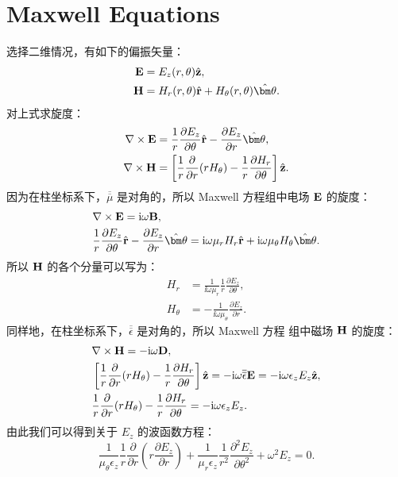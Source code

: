 \chapter{Maxwell Equations}

选择二维情况，有如下的偏振矢量：
\begin{subequations}
  \begin{align}
    {\bf E} &= E_z(r, \theta) \hat{\bf z}, \\
    {\bf H} &= H_r(r, \theta) \hat{\bf r} + H_\theta(r, \theta) \hat{\bm\theta}.
  \end{align}
\end{subequations}
对上式求旋度：
\begin{subequations}
  \begin{align}
    \nabla \times {\bf E} &= \frac{1}{r} \frac{\partial E_z}{\partial\theta}
      \hat{\bf r} - \frac{\partial E_z}{\partial r} \hat{\bm\theta}, \\
    \nabla \times {\bf H} &= \left[\frac{1}{r} \frac{\partial}{\partial r}
      (r H_\theta) - \frac{1}{r} \frac{\partial H_r}{\partial\theta} \right]
      \hat{\bf z}.
  \end{align}
\end{subequations}
因为在柱坐标系下，$\overline{\overline\mu}$ 是对角的，所以 Maxwell 方程组中电场
$\bf E$ 的旋度：
\begin{subequations}
  \begin{align}
    & \nabla \times {\bf E} = \ii \omega {\bf B}, \\
    & \frac{1}{r} \frac{\partial E_z}{\partial\theta} \hat{\bf r} -
      \frac{\partial E_z}{\partial r}\hat{\bm\theta} = \ii \omega \mu_r H_r
      \hat{\bf r} + \ii \omega \mu_\theta H_\theta \hat{\bm\theta}.
  \end{align}
\end{subequations}
所以 $\bf H$ 的各个分量可以写为：
\begin{subequations}
  \begin{align}
    H_r &= \frac{1}{\ii \omega \mu_r} \frac{1}{r}
      \frac{\partial E_z}{\partial\theta}, \\
    H_\theta &= -\frac{1}{\ii \omega \mu_\theta}
      \frac{\partial E_z}{\partial r}.
  \end{align}
\end{subequations}
同样地，在柱坐标系下，$\overline{\overline\epsilon}$ 是对角的，所以 Maxwell 方程
组中磁场 $\bf H$ 的旋度：
\begin{subequations}
  \begin{align}
    & \nabla \times {\bf H} = -\mathrm{i} \omega {\bf D}, \\
    & \left[\frac{1}{r} \frac{\partial}{\partial r}(r H_\theta) - \frac{1}{r}
      \frac{\partial H_r}{\partial\theta} \right] \hat{\bf z} = -\mathrm{i} \omega
      {\overline{\overline\epsilon}} {\bf E} = -\mathrm{i} \omega \epsilon_z E_z
      \hat{\bf z}, \\
    & \frac{1}{r} \frac{\partial}{\partial r}(r H_\theta) - \frac{1}{r}
      \frac{\partial H_r}{\partial\theta} = -\mathrm{i} \omega \epsilon_z E_z.
  \end{align}
\end{subequations}
由此我们可以得到关于 $E_z$ 的波函数方程：
\begin{equation}
  \frac{1}{\mu_\theta \epsilon_z} \frac{1}{r} \frac{\partial}{\partial r}
  \left(r \frac{\partial E_z}{\partial r} \right) + \frac{1}{\mu_r \epsilon_z}
  \frac{1}{r^2} \frac{\partial^2E_z}{\partial\theta^2} +\omega^2 E_z = 0.
\end{equation}
